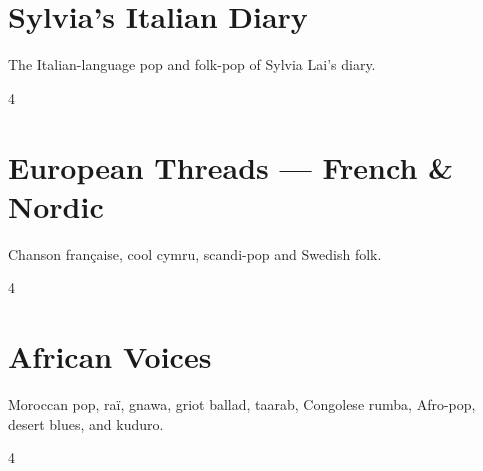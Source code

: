 \documentclass[a4paper,landscape]{memoir}
\begin{document}
\chapter{Sylvia’s Italian Diary}
The Italian-language pop and folk-pop of Sylvia Lai’s diary.
\clearpage\begin{multicols*}{4}
\end{multicols*}

\chapter{European Threads — French \& Nordic}
Chanson française, cool cymru, scandi-pop and Swedish folk.
\clearpage\begin{multicols*}{4}
\end{multicols*}

\chapter{African Voices}
Moroccan pop, raï, gnawa, griot ballad, taarab, Congolese rumba, Afro-pop, desert blues, and kuduro.
\clearpage\begin{multicols*}{4}
\end{multicols*}
\end{document}
